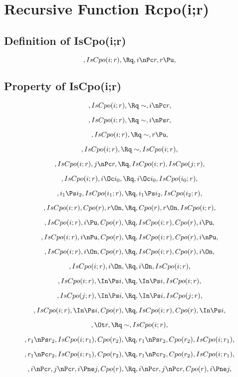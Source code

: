 \chapter{Recursive Function Rcpo(i;r)}

\section{Definition of IsCpo(i;r)}
\[,IsCpo(i;r), \Rq , i \nPc r, r \Pu, \]

\bigskip
\bigskip
\section{Property of IsCpo(i;r)}
\[,IsCpo(i;r), \Rq \sim, i \nPc r, \]

\[,IsCpo(i;r), \Rq \sim, i \nPs r, \]

\[,IsCpo(i;r), \Rq \sim, r \Pu, \]

\[,IsCpo(i;r), \Rq \sim, IsCpo(i;r), \]

\[,IsCpo(i;r), j \nPc r, \Rq , IsCpo(i;r), IsCpo(j;r),\]

\[, IsCpo(i;r), i \Oc i_0, \Rq , i \Oc i_0,  IsCpo(i_0;r),\]

\[, i_1 \Ps i_2, IsCpo(i_1;r), \Rq , i_1 \Ps i_2, IsCpo(i_2;r),\]


\[, IsCpo(i;r), Cpo(r), r\On , \Rq , Cpo(r), r \On, IsCpo(i;r),\]

\[, IsCpo(i;r), i \Pu, Cpo(r),  \Rq , IsCpo(i;r), Cpo(r), i \Pu,\]

\[, IsCpo(i;r), i \nPu, Cpo(r),  \Rq , IsCpo(i;r), Cpo(r), i \nPu,\]

\[, IsCpo(i;r), i \On, Cpo(r),  \Rq , IsCpo(i;r), Cpo(r), i \On,\]

\[, IsCpo(i;r), i \On,  \Rq , i \On, IsCpo(i;r),\]

\[, IsCpo(i;r), \In \Ps i, \Rq , \In \Ps i, IsCpo(i;r), \]

\[, IsCpo(j;r), \In \Ps i, \Rq , \In \Ps i, IsCpo(j;r), \]

\[, IsCpo(i;r), \In \Ps i, Cpo(r), \Rq , IsCpo(i;r), Cpo(r), \In \Ps i,\]

\[, \Ot r, \Rq \sim, IsCpo(i;r), \]

\[, r_1 \nPs r_2, IsCpo(i;r_1), Cpo(r_2), \Rq , r_1 \nPs r_2, Cpo(r_2), IsCpo(i;r_1),\]

\[, r_1 \nPc r_2, IsCpo(i;r_1), Cpo(r_2), \Rq , r_1 \nPc r_2, Cpo(r_2), IsCpo(i;r_1),\]

\[, i \nPc r, j \nPc r, i \Pne j, Cpo(r), \Rq , i \nPc r, j \nPc r, Cpo(r), i \Pne j, \]

